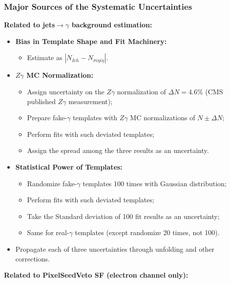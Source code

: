 \begin{frame}\frametitle{Major Sources of the Systematic Uncertainties}

\footnotesize{\bfseries{Related to jets$\rightarrow\gamma$ background estimation:}}
  \begin{itemize}
     \scriptsize
     \item {\bfseries{Bias in Template Shape and Fit Machinery:}} 
        \begin{itemize}
          \tiny
          \item Estimate as $|N_{Ich}-N_{\sigma{i\eta i\eta}}|$.
         \end{itemize}
     \item {\bfseries{$Z\gamma$ MC Normalization:}}
        \begin{itemize}
          \tiny
          \item Assign uncertainty on the $Z\gamma$ normalization of $\Delta N=$4.6\% (CMS published $Z\gamma$ measurement);
          \item Prepare fake-$\gamma$ templates with $Z\gamma$ MC normalizations of $N\pm\Delta N$;
          \item Perform fits with such deviated templates;
          \item Assign the spread among the three results as an uncertainty.
        \end{itemize}
     \item {\bfseries{Statistical Power of Templates:}}
       \begin{itemize}
          \tiny
          \item Randomize fake-$\gamma$ templates 100 times with Gaussian distribution;
          \item Perform fits with such deviated templates;
          \item Take the Standard deviation of 100 fit results as an uncertainty;
          \item Same for real-$\gamma$ templates (except randomize 20 times, not 100).
       \end{itemize}
     \item Propagate each of three uncertainties through unfolding and other corrections.
  \end{itemize}

\footnotesize{\bfseries{Related to PixelSeedVeto SF (electron channel only):}}\scriptsize{}

\end{frame}%
